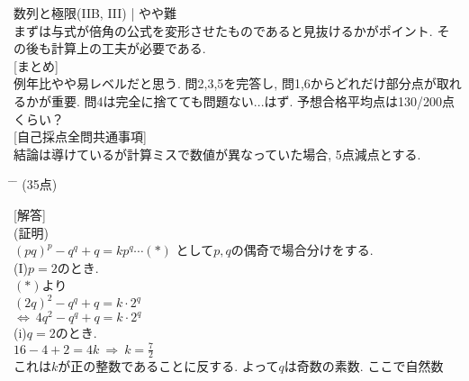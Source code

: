 \documentclass{article}
\begin{document}
     数列と極限(IIB, III) | やや難 \\
  \hspace{0.22in}まずは与式が倍角の公式を変形させたものであると見抜けるかがポイント. そ\\
  \hspace{0.22in}の後も計算上の工夫が必要である.\vspace{0.2in}\\
 {\large[まとめ]}\vspace{0.1in}\\
 例年比やや易レベルだと思う. 問2,3,5を完答し, 問1,6からどれだけ部分点が取れるかが重要. 問4は完全に捨てても問題ない...はず. 予想合格平均点は130/200点くらい？\vspace{0.2in}\\
{\large[自己採点全問共通事項]}\vspace{0.1in}\\
結論は導けているが計算ミスで数値が異なっていた場合, 5点減点とする.
 \newpage
\begin{tabbing}
\hspace{0.91\textwidth} \= \hspace{0.8\textwidth} \= \kill
\textsf{}\> (35点)\>\\
\end{tabbing}
[{\large 解答}]\vspace{0.1in}\\
(証明)\vspace{0.1in}\\
$(pq)^p-q^q+q=kp^q\cdots (\ast)$ として$p,q$の偶奇で場合分けをする.\vspace{0.1in}\\
(I)$p=2$のとき.\vspace{0.1in}\\
$(\ast)$より\vspace{0.1in}\\
$(2q)^2-q^q+q=k\cdot 2^q$\vspace{0.1in}\\
$\Leftrightarrow \ 4q^2-q^q+q=k\cdot 2^q$\vspace{0.1in}\\
(i)$q=2$のとき.\vspace{0.1in}\\
$16-4+2=4k\ \Rightarrow \ k=\frac{7}{2}$\vspace{0.1in}\\
これは$k$が正の整数であることに反する. よって$q$は奇数の素数.  ここで自然数\vspace{0.1in}\\
\end{document}

